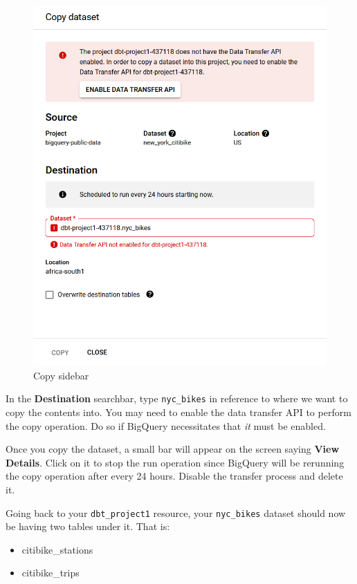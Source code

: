 \documentclass[
]{book}
\providecommand{\tightlist}{%
  \setlength{\itemsep}{0pt}\setlength{\parskip}{0pt}}
\begin{document}
\begin{figure}
\centering
\includegraphics{./images/copy_sidebar.png}
\caption{Copy sidebar}
\end{figure}

In the \textbf{Destination} searchbar, type \texttt{nyc\_bikes} in reference to where we want to copy the contents into. You may need to enable the data transfer API to perform the copy operation. Do so if BigQuery necessitates that \emph{it} must be enabled.

Once you copy the dataset, a small bar will appear on the screen saying \textbf{View Details}. Click on it to stop the run operation since BigQuery will be rerunning the copy operation after every 24 hours. Disable the transfer process and delete it.

Going back to your \texttt{dbt\_project1} resource, your \texttt{nyc\_bikes} dataset should now be having two tables under it. That is:

\begin{itemize}
\tightlist
\item
  citibike\_stations
\item
  citibike\_trips
\end{itemize}
\end{document}
